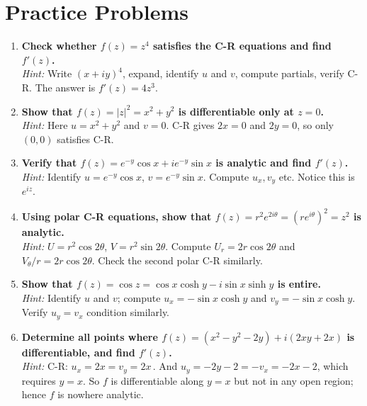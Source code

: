 \documentclass[12pt,a4paper]{article}
\begin{document}
\section{Practice Problems}

\begin{enumerate}
  \item \textbf{Check whether $f(z) = z^4$ satisfies the C-R equations and find $f'(z)$.}\\
  \textit{Hint:} Write $(x+iy)^4$, expand, identify $u$ and $v$, compute partials, verify C-R. The answer is $f'(z) = 4z^3$.

  \item \textbf{Show that $f(z) = |z|^2 = x^2 + y^2$ is differentiable only at $z = 0$.}\\
  \textit{Hint:} Here $u = x^2+y^2$ and $v = 0$. C-R gives $2x = 0$ and $2y = 0$, so only $(0,0)$ satisfies C-R.

  \item \textbf{Verify that $f(z) = e^{-y}\cos x + ie^{-y}\sin x$ is analytic and find $f'(z)$.}\\
  \textit{Hint:} Identify $u = e^{-y}\cos x$, $v = e^{-y}\sin x$. Compute $u_x, v_y$ etc. Notice this is $e^{iz}$.

  \item \textbf{Using polar C-R equations, show that $f(z) = r^2 e^{2i\theta} = (re^{i\theta})^2 = z^2$ is analytic.}\\
  \textit{Hint:} $U = r^2\cos 2\theta$, $V = r^2\sin 2\theta$. Compute $U_r = 2r\cos2\theta$ and $V_\theta/r = 2r\cos2\theta$. Check the second polar C-R similarly.

  \item \textbf{Show that $f(z) = \cos z = \cos x\cosh y - i\sin x\sinh y$ is entire.}\\
  \textit{Hint:} Identify $u$ and $v$; compute $u_x = -\sin x\cosh y$ and $v_y = -\sin x\cosh y$. Verify $u_y = v_x$ condition similarly.

  \item \textbf{Determine all points where $f(z) = (x^2 - y^2 - 2y) + i(2xy + 2x)$ is differentiable, and find $f'(z)$.}\\
  \textit{Hint:} C-R: $u_x = 2x = v_y = 2x$\,\checkmark. And $u_y = -2y-2 = -v_x = -2x-2$, which requires $y = x$. So $f$ is differentiable along $y = x$ but not in any open region; hence $f$ is nowhere analytic.
\end{enumerate}
\end{document}
